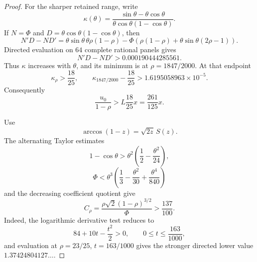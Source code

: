 \documentclass[11pt]{article}
\theoremstyle{remark}
\begin{document}
\begin{proof}
For the sharper retained range, write
\[
 \kappa(\theta)=
 \frac{\sin\theta-\theta\cos\theta}
 {\theta\cos\theta(1-\cos\theta)}.
\]
If $N=\Phi$ and $D=\theta\cos\theta(1-\cos\theta)$, then
\begin{equation}
 N'D-ND'=
 \theta\sin\theta\,\theta\rho(1-\rho)
 -\Phi\left(\rho(1-\rho)
 +\theta\sin\theta(2\rho-1)\right).
 \label{eq:high-floor-round-eight-g-kappa-numerator}
\end{equation}
Directed evaluation on $64$ complete rational panels gives
\[
 N'D-ND'>0.000190444285561.
\]
Thus $\kappa$ increases with $\theta$, and its minimum is at
$\rho=1847/2000$.  At that endpoint
\begin{equation}
 \boxed{\kappa_\rho>\frac{18}{25},}
 \qquad
 \kappa_{1847/2000}-\frac{18}{25}
 >1.6195058963\times10^{-5}.
 \label{eq:high-floor-round-eight-g-kappa}
\end{equation}
Consequently
\begin{equation}
 \frac{u_0}{1-\rho}>
 L\frac{18}{25}x=\frac{261}{125}x.
 \label{eq:high-floor-round-eight-g-retained-range}
\end{equation}

Use
\[
 \arccos(1-z)=\sqrt{2z}\,S(z).
\]
The alternating Taylor estimates
\[
 1-\cos\theta>
 \theta^2\left(\frac12-\frac{\theta^2}{24}\right),
\]
\[
 \Phi<\theta^3\left(
 \frac13-\frac{\theta^2}{30}+\frac{\theta^4}{840}\right)
\]
and the decreasing coefficient quotient give
\begin{equation}
 \boxed{
 C_\rho=\frac{\rho\sqrt2(1-\rho)^{3/2}}{\Phi}
 >\frac{137}{100}.}
 \label{eq:high-floor-round-eight-g-coefficient}
\end{equation}
Indeed, the logarithmic derivative test reduces to
\[
 84+10t-\frac{t^2}{2}>0,\qquad
 0\leq t\leq\frac{163}{1000},
\]
and evaluation at $\rho=23/25$, $t=163/1000$ gives the stronger
directed lower value $1.37424804127\ldots$.


\end{proof}
\end{document}
